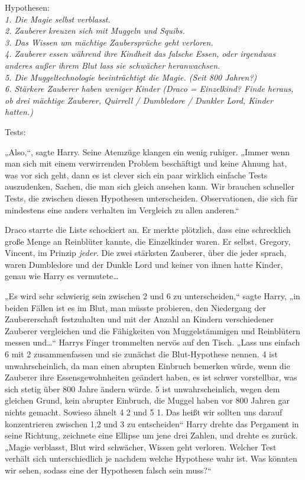 {Hypothesen:\\ \emph{1. Die Magie selbst verblasst.}\\ \emph{2. Zauberer} \emph{kreuzen sich mit Muggeln und Squibs.}\\ \emph{3. Das Wissen um mächtige Zaubersprüche geht verloren.}\\ \emph{4. Zauberer essen während ihre Kindheit das falsche Essen, oder irgendwas anderes außer ihrem Blut lass sie schwächer heranwachsen.}\\ \emph{5. Die Muggeltechnologie beeinträchtigt die Magie. (Seit 800 Jahren?)}\\ \emph{6. Stärkere Zauberer haben weniger Kinder (Draco = Einzelkind? Finde heraus, ob drei mächtige Zauberer, Quirrell / Dumbledore / Dunkler Lord, Kinder hatten.)}

Tests:

„Also,“, sagte Harry. Seine Atemzüge klangen ein wenig ruhiger. „Immer wenn man sich mit einem verwirrenden Problem beschäftigt und keine Ahnung hat, was vor sich geht, dann es ist clever sich ein paar wirklich einfache Tests auszudenken, Sachen, die man sich gleich ansehen kann. Wir brauchen schneller Tests, die zwischen diesen Hypothesen unterscheiden. Observationen, die sich für mindestens eine anders verhalten im Vergleich zu allen anderen.“

Draco starrte die Liste schockiert an. Er merkte plötzlich, dass eine schrecklich große Menge an Reinblüter kannte, die Einzelkinder waren. Er selbst, Gregory, Vincent, im Prinzip \emph{jeder}. Die zwei stärksten Zauberer, über die jeder sprach, waren Dumbledore und der Dunkle Lord und keiner von ihnen hatte Kinder, genau wie Harry es vermutete…

„Es wird sehr schwierig sein zwischen 2 und 6 zu unterscheiden,“ sagte Harry, „in beiden Fällen ist es im Blut, man müsste probieren, den Niedergang der Zaubererschaft festzuhalten und mit der Anzahl an Kindern verschiedener Zauberer vergleichen und die Fähigkeiten von Muggelstämmigen und Reinblütern messen und…“ Harrys Finger trommelten nervös auf den Tisch. „Lass uns einfach 6 mit 2 zusammenfassen und sie zunächst die Blut-Hypothese nennen. 4 ist unwahrscheinlich, da man einen abrupten Einbruch bemerken würde, wenn die Zauberer ihre Essensgewohnheiten geändert haben, es ist schwer vorstellbar, was sich stetig über 800 Jahre ändern würde. 5 ist unwahrscheinlich, wegen dem gleichen Grund, kein abrupter Einbruch, die Muggel haben vor 800 Jahren gar nichts gemacht. Sowieso ähnelt 4 2 und 5 1. Das heißt wir sollten uns darauf konzentrieren zwischen 1,2 und 3 zu entscheiden“ Harry drehte das Pergament in seine Richtung, zeichnete eine Ellipse um jene drei Zahlen, und drehte es zurück. „Magie verblasst, Blut wird schwächer, Wissen geht verloren. Welcher Test verhält sich unterschiedlich je nachdem welche Hypothese wahr ist. Was könnten wir sehen, sodass eine der Hypothesen falsch sein muss?“

}
